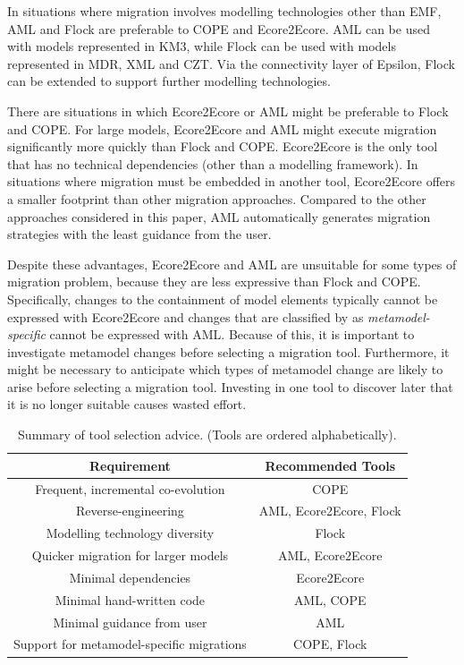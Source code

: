 In situations where migration involves modelling technologies other than EMF, AML and Flock are preferable to COPE and Ecore2Ecore. AML can be used with models represented in KM3, while Flock can be used with models represented in MDR, XML and CZT. Via the connectivity layer of Epsilon, Flock can be extended to support further modelling technologies.

There are situations in which Ecore2Ecore or AML might be preferable to Flock and COPE. For large models, Ecore2Ecore and AML might execute migration significantly more quickly than Flock and COPE. Ecore2Ecore is the only tool that has no technical dependencies (other than a modelling framework). In situations where migration must be embedded in another tool, Ecore2Ecore offers a smaller footprint than other migration approaches. Compared to the other approaches considered in this paper, AML automatically generates migration strategies with the least guidance from the user.

Despite these advantages, Ecore2Ecore and AML are unsuitable for some types of migration problem, because they are less expressive than Flock and COPE. Specifically, changes to the containment of model elements typically cannot be expressed with Ecore2Ecore and changes that are classified by %
\cite{herrmannsdoerfer08automatability} as \emph{metamodel-specific}
cannot be expressed with AML. Because of this, it is important to investigate metamodel changes before selecting a migration tool. Furthermore, it might be necessary to anticipate which types of metamodel change are likely to arise before selecting a migration tool. Investing in one tool to discover later that it is no longer suitable causes wasted effort.

\begin{table}[hbtp]
	\centering
	\caption{Summary of tool selection advice. (Tools are ordered alphabetically).}
	\label{tab:advice}
	\begin{tabular}{|c|c|}
	\hline
	\textbf{Requirement}    & \textbf{Recommended Tools} \\
	\hline
	Frequent, incremental co-evolution                & COPE \\
	\hline
	Reverse-engineering                               & AML, Ecore2Ecore, Flock \\
	\hline
	Modelling technology diversity                    & Flock \\
	\hline
	Quicker migration for larger models               & AML, Ecore2Ecore \\
	\hline
	Minimal dependencies                              & Ecore2Ecore \\
	\hline
	Minimal hand-written code                         & AML, COPE \\
	\hline
	Minimal guidance from user                        & AML \\
	\hline
	Support for metamodel-specific migrations   & COPE, Flock \\
	\hline
	\end{tabular}
\end{table}


